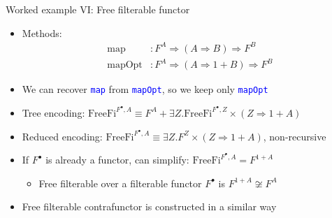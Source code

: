 \documentclass[english,,russian]{beamer}
\begin{document}
\begin{frame}{Worked example VI: Free filterable functor}
\begin{itemize}
\item Methods: {\footnotesize{}\vspace{-0.15cm}}
\begin{align*}
\text{map} & :F^{A}\Rightarrow\left(A\Rightarrow B\right)\Rightarrow F^{B}\\
\text{mapOpt} & :F^{A}\Rightarrow\left(A\Rightarrow1+B\right)\Rightarrow F^{B}
\end{align*}
\item {\footnotesize{}\vspace{-0.35cm}}We can recover \texttt{\textcolor{blue}{\footnotesize{}map}}
from \texttt{\textcolor{blue}{\footnotesize{}mapOpt}}, so we keep
only \texttt{\textcolor{blue}{\footnotesize{}mapOpt}} 
\item Tree encoding: $\text{FreeFi}^{F^{\bullet},A}\equiv F^{A}+\exists Z.\text{FreeFi}^{F^{\bullet},Z}\times\left(Z\Rightarrow1+A\right)$
\item Reduced encoding: $\text{FreeFi}^{F^{\bullet},A}\equiv\exists Z.F^{Z}\times\left(Z\Rightarrow1+A\right)$,
non-recursive
\item If $F^{\bullet}$ is already a functor, can simplify: $\text{FreeFi}^{F^{\bullet},A}=F^{1+A}$
\begin{itemize}
\item Free filterable over a filterable functor $F^{\bullet}$ is $F^{1+A}\not\cong F^{A}$
\end{itemize}
\item Free filterable contrafunctor is constructed in a similar way
\end{itemize}
\end{frame}
\end{document}
